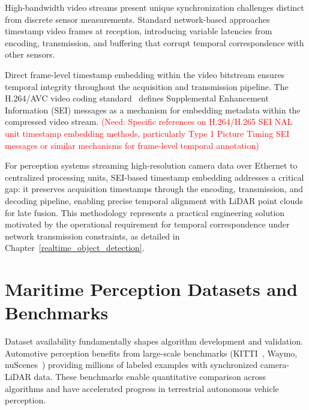 \documentclass[../main.tex]{subfiles}
\begin{document}
High-bandwidth video streams present unique synchronization challenges distinct from discrete sensor measurements.
Standard network-based approaches timestamp video frames at reception, introducing variable latencies from encoding, transmission, and buffering that corrupt temporal correspondence with other sensors.

Direct frame-level timestamp embedding within the video bitstream ensures temporal integrity throughout the acquisition and transmission pipeline.
The H.264/AVC video coding standard~\cite{wiegand2003} defines Supplemental Enhancement Information (SEI) messages as a mechanism for embedding metadata within the compressed video stream.
\textcolor{red}{(Need: Specific references on H.264/H.265 SEI NAL unit timestamp embedding methods, particularly Type 1 Picture Timing SEI messages or similar mechanisms for frame-level temporal annotation)}

For perception systems streaming high-resolution camera data over Ethernet to centralized processing units, SEI-based timestamp embedding addresses a critical gap: it preserves acquisition timestamps through the encoding, transmission, and decoding pipeline, enabling precise temporal alignment with \ac{LiDAR} point clouds for late fusion.
This methodology represents a practical engineering solution motivated by the operational requirement for temporal correspondence under network transmission constraints, as detailed in Chapter~\ref{realtime_object_detection}.

\section{Maritime Perception Datasets and Benchmarks}

Dataset availability fundamentally shapes algorithm development and validation.
Automotive perception benefits from large-scale benchmarks (KITTI~\cite{geiger2013}, Waymo, nuScenes~\cite{caesar2020}) providing millions of labeled examples with synchronized camera-LiDAR data.
These benchmarks enable quantitative comparison across algorithms and have accelerated progress in terrestrial autonomous vehicle perception.
\end{document}
